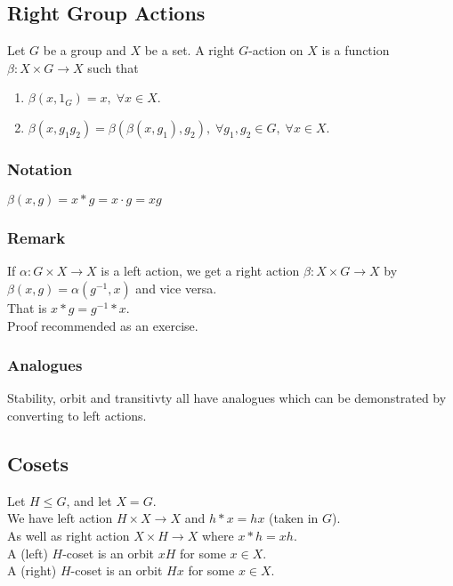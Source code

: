 \documentclass[11pt]{article}
\newcommand{\0}{\emptyset}
\begin{document}
\subsection*{Right Group Actions}
\label{sec:orgae87634}
Let \(G\) be a group and \(X\) be a set. A right \(G\)-action on \(X\) is a function \(\beta:X\times G\to X\) such that\\[0pt]
\begin{enumerate}
\item \(\beta(x,1_{G})=x,\;\forall x\in X\).\\[0pt]
\item \(\beta(x,g_{1}g_{2})=\beta(\beta(x,g_{1}),g_{2}),\;\forall g_{1},g_{2}\in G,\;\forall x\in X\).\\[0pt]
\end{enumerate}
\subsubsection*{Notation}
\label{sec:org5a5c926}
\(\beta(x,g)=x*g=x\cdot g=xg\)\\[0pt]
\subsubsection*{Remark}
\label{sec:orgef84eb8}
If \(\alpha:G\times X\to X\) is a left action, we get a right action \(\beta:X\times G\to X\) by \(\beta(x,g)=\alpha(g^{-1},x)\) and vice versa.\\[0pt]
That is \(x*g=g^{-1}*x\).\\[0pt]
Proof recommended as an exercise.\\[0pt]
\subsubsection*{Analogues}
\label{sec:org9b42985}
Stability, orbit and transitivty all have analogues which can be demonstrated by converting to left actions.\\[0pt]
\subsection*{Cosets}
\label{sec:orgf0c3bfa}
Let \(H\leq G\), and let \(X=G\).\\[0pt]
We have left action \(H\times X\to X\) and \(h*x=hx\) (taken in \(G\)).\\[0pt]
As well as right action \(X\times H\to X\) where \(x*h=xh\).\\[0pt]
A (left) \(H\)-coset is an orbit \(xH\) for some \(x\in X\).\\[0pt]
A (right) \(H\)-coset is an orbit \(Hx\) for some \(x\in X\).\\[0pt]
\end{document}
